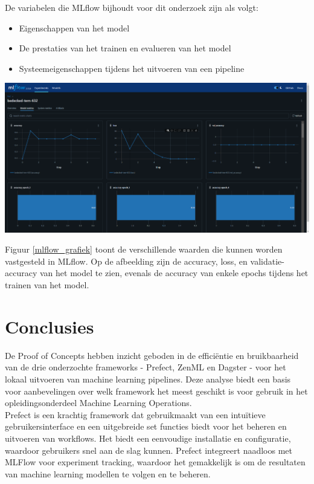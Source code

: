\documentclass[a0,portrait]{hogent-poster}
\begin{document}
\begin{multicols}{2}
De variabelen die MLflow bijhoudt voor dit onderzoek zijn als volgt:
\begin{itemize}
  \item Eigenschappen van het model
  \item De prestaties van het trainen en evalueren van het model
  \item Systeemeigenschappen tijdens het uitvoeren van een pipeline
\end{itemize}

\begin{center}
  \captionsetup{type=figure}
  \includegraphics[width=1.0\linewidth]{graphics/mlflow_Graph.PNG}
  \label{fig:mlflow_grafiek}
\end{center}

Figuur \ref{mlflow_grafiek} toont de verschillende waarden die kunnen worden vastgesteld in MLflow. Op de afbeelding zijn de accuracy, loss, en validatie-accuracy van het model te zien, evenals de accuracy van enkele epochs tijdens het trainen van het model.
\section{Conclusies}

De Proof of Concepts hebben inzicht geboden in de efficiëntie en bruikbaarheid van de drie onderzochte frameworks - Prefect, ZenML en Dagster - voor het lokaal uitvoeren van machine learning pipelines. Deze analyse biedt een basis voor aanbevelingen over welk framework het meest geschikt is voor gebruik in het opleidingsonderdeel Machine Learning Operations.\\

Prefect is een krachtig framework dat gebruikmaakt van een intuïtieve gebruikersinterface en een uitgebreide set functies biedt voor het beheren en uitvoeren van workflows. Het biedt een eenvoudige installatie en configuratie, waardoor gebruikers snel aan de slag kunnen. Prefect integreert naadloos met MLFlow voor experiment tracking, waardoor het gemakkelijk is om de resultaten van machine learning modellen te volgen en te beheren.\\


\end{multicols}
\end{document}
